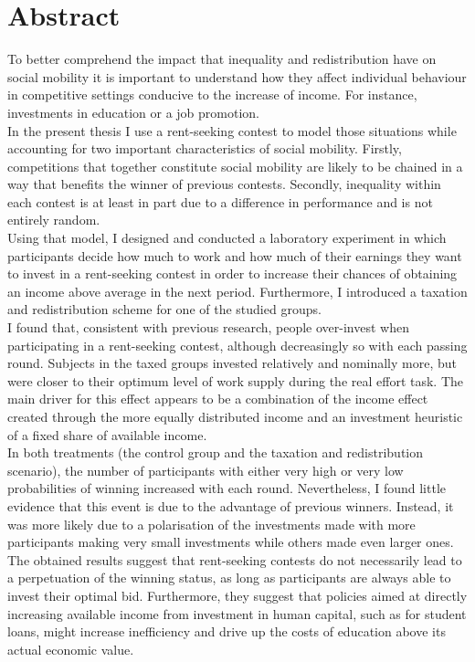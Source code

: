 \chapter*{Abstract}

\begin{small}
To better comprehend the impact that inequality and redistribution have on social mobility it is important to understand how they affect individual behaviour in competitive settings conducive to the increase of income. For instance, investments in education or a job promotion.\\

In the present thesis I use a rent-seeking contest to model those situations while accounting for two important characteristics of social mobility. Firstly, competitions that together constitute social mobility are likely to be chained in a way that benefits the winner of previous contests. Secondly, inequality within each contest is at least in part due to a difference in performance and is not entirely random.\\

Using that model, I designed and conducted a laboratory experiment in which participants decide how much to work and how much of their earnings they want to invest in a rent-seeking contest in order to increase their chances of obtaining an income above average in the next period. Furthermore, I introduced a taxation and redistribution scheme for one of the studied groups.\\

I found that, consistent with previous research, people over-invest when participating in a rent-seeking contest, although decreasingly so with each passing round. Subjects in the taxed groups invested relatively and nominally more, but were closer to their optimum level of work supply during the real effort task. The main driver for this effect appears to be a combination of the income effect created through the more equally distributed income and an investment heuristic of a fixed share of available income.\\

In both treatments (the control group and the taxation and redistribution scenario), the number of participants with either very high or very low probabilities of winning increased with each round. Nevertheless, I found little evidence that this event is due to the advantage of previous winners. Instead, it was more likely due to a polarisation of the investments made with more participants making very small investments while others made even larger ones.\\

The obtained results suggest that rent-seeking contests do not necessarily lead to a perpetuation of the winning status, as long as participants are always able to invest their optimal bid. Furthermore, they suggest that policies aimed at directly increasing available income from investment in human capital, such as for student loans, might increase inefficiency and drive up the costs of education above its actual economic value.\\

\end{small}

